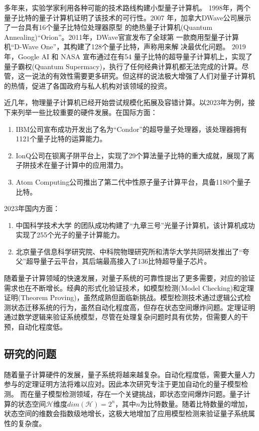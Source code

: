 多年来，实验学家利用各种可能的技术路线构建小型量子计算机。 1998年，两个量子比特的量子计算机证明了该技术的可行性\citep{chuang1998experimental}。2007
年，加拿大DWave公司展示了一台具有16个量子比特位处理器原型
的绝热量子计算机(Quantum Annealing)“Orion”。2011年，DWave官宣发布了全球第
一款商用型量子计算机“D-Wave One”，其构建了128个量子比特，声称用来解
决最优化问题。
2019 年，Google AI 和 NASA 宣布通过在有54 量子比特的超导量子计算机上，实现了量子霸权(Quantum Supermacy)，执行了任何经典计算机都无法完成的计算\citep{arute2019quantum}。尽管，这一说法的有效性需要更多研究\citep{pednault2019quantum}。但这样的说法极大增强了人们对量子计算机的热情，促进了各国政府与私人机构对该领域的投资。

近几年，物理量子计算机已经开始尝试规模化拓展及容错计算。以2023年为例，接下来列举一些比较重要的硬件发展。在国际方面：
\begin{enumerate}
    \item IBM公司宣布成功开发出了名为“Condor”的超导量子处理器，该处理器拥有1121个量子比特的运算能力\citep{condor}。
    \item IonQ公司在钡离子阱平台上，实现了29个算法量子比特的重大成就，展现了离子阱技术在量子计算中的应用潜力\citep{chen2023benchmarking}。
    \item Atom Computing公司推出了第二代中性原子量子计算平台，具备1180个量子比特\citep{AtomComputing2023}。
\end{enumerate}
2023年国内方面：
\begin{enumerate}
    \item 中国科学技术大学 的团队成功构建了“九章三号”光量子计算机，该计算机成功实现了255个光子的量子计算能力\citep{deng2023gaussian}。
    \item 北京量子信息科学研究院、中科院物理研究所和清华大学共同研发推出了“夸父”超导量子云平台，其后端最高接入了136比特超导量子芯片\citep{QuantumCloudPlatform2023}。
\end{enumerate}

随着量子计算领域的快速发展，对量子系统的可靠性提出了更多需要，对应的验证需求也在不断增长。经典的形式化验证技术，如模型检测(Model Checking)和定理证明(Theorem Proving)，虽然成熟但面临新挑战。模型检测技术通过逻辑公式检测状态迁移系统的行为，虽然自动化程度高，但存在状态空间爆炸问题。定理证明通过数学逻辑来验证系统模型，尽管在处理复杂问题时具有优势，但需要人的干预，自动化程度低。
\subsection{研究的问题}
随着量子计算硬件的发展，量子系统将越来越复杂。自动化程度低，需要大量人力参与的定理证明方法将难以应对。因此本次研究专注于更加自动化的量子模型检测。
而在量子模型检测领域，存在一个关键挑战，即状态空间爆炸问题。量子计算的状态空间\(\mathcal{H}\)维度\(dim\left(\mathcal{H}\right)=2^n\)，其中$n$为比特数量。随着比特数量的增加，状态空间的维数会指数级地增长，这极大地增加了应用模型检测来验证量子系统属性的复杂度。

